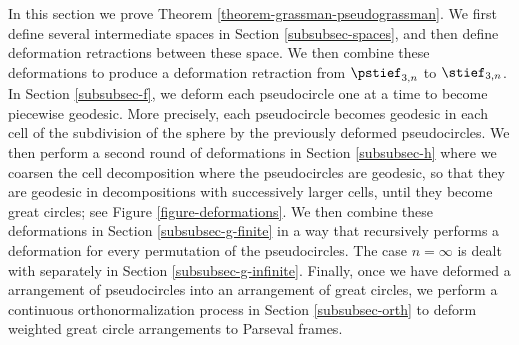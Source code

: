 In this section we prove Theorem \ref{theorem-grassman-pseudograssman}.
We first define several intermediate spaces in Section \ref{subsubsec-spaces}, and then define deformation retractions between these space. We then combine these deformations to produce a deformation retraction from $\pstief_{3,n}$ to $\stief_{3,n}$.
In Section \ref{subsubsec-f}, we deform each pseudocircle one at a time to become piecewise geodesic. More precisely, each pseudocircle becomes geodesic in each cell of the subdivision of the sphere by the previously deformed pseudocircles. We then perform a second round of deformations in Section \ref{subsubsec-h} where we coarsen the cell decomposition where the pseudocircles are geodesic, so that they are geodesic in decompositions with successively larger cells, until they become great circles; see Figure \ref{figure-deformations}. We then combine these deformations in Section \ref{subsubsec-g-finite} in a way that recursively performs a deformation for every permutation of the pseudocircles. The case $n=\infty$ is dealt with separately in Section \ref{subsubsec-g-infinite}. Finally, once we have deformed a arrangement of pseudocircles into an arrangement of great circles, we perform a continuous orthonormalization process in Section \ref{subsubsec-orth} to deform weighted great circle arrangements to Parseval frames.

